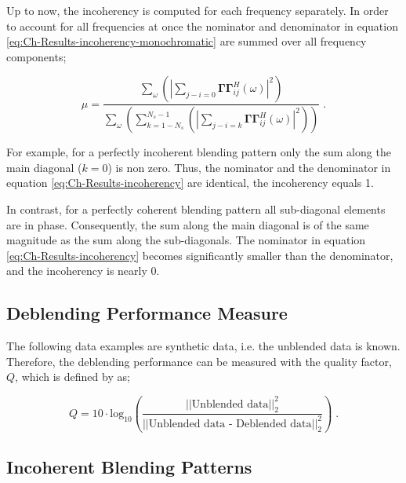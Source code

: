 Up to now, the incoherency is computed for each frequency separately. In order to account for all frequencies at once the nominator and denominator in equation \ref{eq:Ch-Results-incoherency-monochromatic} are summed over all frequency components;

\begin{equation}
	\mu = \frac{  \sum_{\omega} \left( \left| \sum_{j-i = 0} \mathbf{\Gamma \Gamma}^H_{ij} (\omega) \right|^2  \right)  }{  \sum_{\omega} \left( \sum_{k = 1-N_s}^{N_s-1}	 \left( \left| \sum_{j-i = k} \mathbf{\Gamma \Gamma}^H_{ij} (\omega) \right|^2 \right) \right)  } \;.
	\label{eq:Ch-Results-incoherency}
\end{equation}



For example, for a perfectly incoherent blending pattern only the sum along the main diagonal ($k=0$) is non zero. Thus, the nominator and the denominator in equation \ref{eq:Ch-Results-incoherency} are identical, the incoherency equals 1. 

In contrast, for a perfectly coherent blending pattern all sub-diagonal elements are in phase. Consequently, the sum along the main diagonal is of the same magnitude as the sum along the sub-diagonals. The nominator in equation \ref{eq:Ch-Results-incoherency} becomes significantly smaller than the denominator, and the incoherency is nearly 0.



\subsection*{Deblending Performance Measure}

The following data examples are synthetic data, i.e. the unblended data is known. Therefore, the deblending performance can be measured with the quality factor, $Q$, which is defined by \citet{IbrahimQuality} as;

\begin{equation}
	Q = 10 \cdot \mathrm{log_{10}} \left( \frac{\left|\left|\text{Unblended data}\right|\right| _2 ^2}{\left|\left|\text{Unblended data - Deblended data}\right|\right| _2 ^2} \right) \;.	
\end{equation}



\subsection*{Incoherent Blending Patterns}


